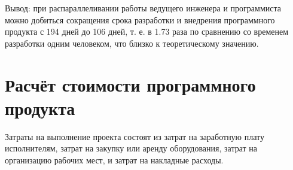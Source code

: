\documentclass[a4paper,12pt]{article}\usepackage[]{graphicx}\usepackage[]{color}
\numberwithin{equation}{section}
\begin{document}
Вывод:  при  распараллеливании  работы  ведущего  инженера  и 
программиста  можно  добиться  сокращения  срока  разработки  и  внедрения 
программного продукта с 194 дней до 106 дней, т. е. в 1.73 раза по сравнению 
со  временем  разработки  одним  человеком,  что  близко  к  теоретическому 
значению.

\section{Расчёт стоимости программного продукта}

Затраты на выполнение проекта состоят из затрат на заработную плату 
исполнителям,  затрат  на  закупку  или  аренду  оборудования,  затрат  на 
организацию рабочих мест, и затрат на накладные расходы.
\end{document}
